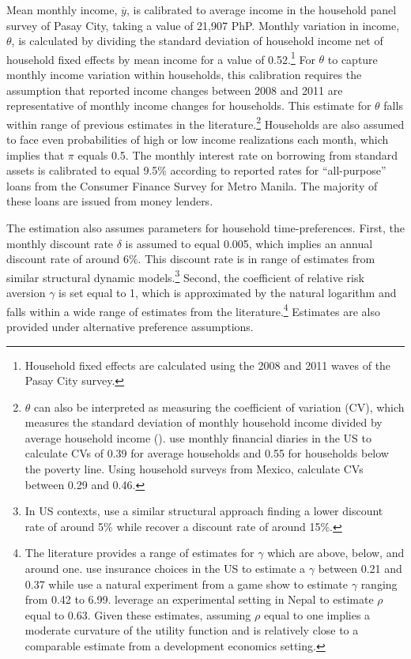 \documentclass[12pt]{article}
\begin{document}
Mean monthly income, $\overline{y}$, is calibrated to average income in the household panel survey of Pasay City, taking a value of 21,907 PhP.  Monthly variation in income, $\theta$, is calculated by dividing the standard deviation of household income net of household fixed effects by mean income for a value of 0.52\unskip.\footnote{Household fixed effects are calculated using the 2008 and 2011 waves of the Pasay City survey.}  For $\theta$ to capture monthly income variation within households, this calibration requires the assumption that reported income changes between 2008 and 2011 are representative of monthly income changes for households.  This estimate for $\theta$ falls within range of previous estimates in the literature.\footnote{$\theta$ can also be interpreted as measuring the coefficient of variation (CV), which measures the standard deviation of monthly household income divided by average household income (\cite{hannagan2015income}).  \cite{hannagan2015income} use monthly financial diaries in the US to calculate CVs of 0.39 for average households and 0.55 for households below the poverty line.  Using household surveys from Mexico, \cite{amuedo2011remittances} calculate CVs between 0.29 and 0.46.}  Households are also assumed to face even probabilities of high or low income realizations each month, which implies that $\pi$ equals 0.5.  The monthly interest rate on borrowing from standard assets is calibrated to equal 9.5\unskip\% according to reported rates for ``all-purpose'' loans from the Consumer Finance Survey for Metro Manila.  The majority of these loans are issued from money lenders.

The estimation also assumes parameters for household time-preferences.  First, the monthly discount rate $\delta$ is assumed to equal 0.005, which implies an annual discount rate of around 6\%. This discount rate is in range of estimates from similar structural dynamic models.\footnote{In US contexts, \cite{gourinchas2002consumption} use a similar structural approach finding a lower discount rate of around 5\% while \cite{laibson2007estimating} recover a discount rate of around 15\%.}  Second, the coefficient of relative risk aversion $\gamma$ is set equal to 1, which is approximated by the natural logarithm and falls within a wide range of estimates from the literature.\footnote{The literature provides a range of estimates for $\gamma$ which are above, below, and around one.  \cite{barseghyan2013nature} use insurance choices in the US to estimate a $\gamma$ between 0.21 and 0.37 while  \cite{beetsma2001measuring} use a natural experiment from a game show to estimate $\gamma$ ranging from 0.42 to 6.99.  \cite{carvalho2016effect} leverage an experimental setting in Nepal to estimate $\rho$ equal to 0.63.  Given these estimates, assuming $\rho$ equal to one implies a moderate curvature of the utility function and is relatively close to a comparable estimate from a development economics setting.}  Estimates are also provided under alternative preference assumptions.
\end{document}

